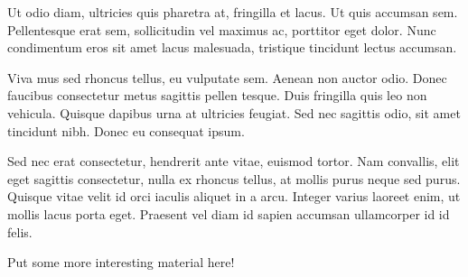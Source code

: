 \documentclass[11pt,a4paper]{uob-leaflet}
\begin{document}
\dottedhline

\begin{thirdcolumn}

  \small %
  Ut odio diam, ultricies quis pharetra at, fringilla et lacus. Ut quis accumsan
  sem. Pellentesque erat sem, sollicitudin vel maximus ac, porttitor eget
  dolor. Nunc condimentum eros sit amet lacus malesuada, tristique tincidunt
  lectus accumsan.
\end{thirdcolumn}
\hfill
\dottedvline{50mm}
\hfill
\begin{thirdcolumn}

  \small\raggedright %
  Viva mus sed rhoncus tellus, eu vulputate sem. Aenean non auctor odio. Donec
  faucibus consectetur metus sagittis pellen tesque. Duis fringilla quis leo non
  vehicula. Quisque dapibus urna at ultricies feugiat. Sed nec sagittis odio,
  sit amet tincidunt nibh. Donec eu consequat ipsum.
\end{thirdcolumn}
\hfill
\dottedvline{50mm}
\hfill
\begin{thirdcolumn}

  \small
  Sed nec erat consectetur, hendrerit ante vitae, euismod tortor. Nam convallis,
  elit eget sagittis consectetur, nulla ex rhoncus tellus, at mollis purus neque
  sed purus. Quisque vitae velit id orci iaculis aliquet in a arcu. Integer
  varius laoreet enim, ut mollis lacus porta eget. Praesent vel diam id sapien
  accumsan ullamcorper id id felis.
\end{thirdcolumn}


\nextpage

Put some more interesting material here!
\end{document}
